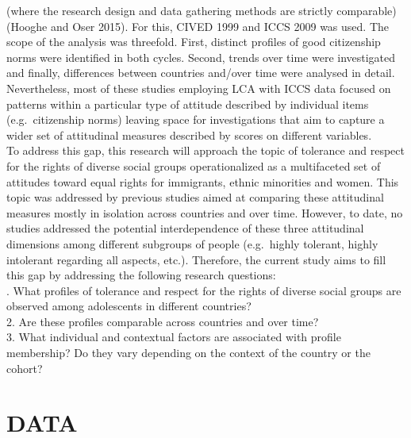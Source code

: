 \documentclass[
      11pt,
                      ]{article}
\begin{document}
(where the research design and data gathering methods are strictly
comparable) (Hooghe and Oser 2015). For this, CIVED 1999 and ICCS 2009
was used. The scope of the analysis was threefold. First, distinct
profiles of good citizenship norms were identified in both cycles.
Second, trends over time were investigated and finally, differences
between countries and/over time were analysed in detail. Nevertheless,
most of these studies employing LCA with ICCS data focused on patterns
within a particular type of attitude described by individual items
(e.g.~citizenship norms) leaving space for investigations that aim to
capture a wider set of attitudinal measures described by scores on
different variables.\\
\newline  To address this gap, this research will approach the topic of
tolerance and respect for the rights of diverse social groups
operationalized as a multifaceted set of attitudes toward equal rights
for immigrants, ethnic minorities and women. This topic was addressed by
previous studies aimed at comparing these attitudinal measures mostly in
isolation across countries and over time. However, to date, no studies
addressed the potential interdependence of these three attitudinal
dimensions among different subgroups of people (e.g.~highly tolerant,
highly intolerant regarding all aspects, etc.). Therefore, the current
study aims to fill this gap by addressing the following research
questions:\\
. What profiles of tolerance and respect for the rights of diverse
social groups are observed among adolescents in different countries?\\
2. Are these profiles comparable across countries and over time?\\
3. What individual and contextual factors are associated with profile
membership? Do they vary depending on the context of the country or the
cohort?

\hypertarget{data}{%
\section{DATA}\label{data}}
\end{document}
